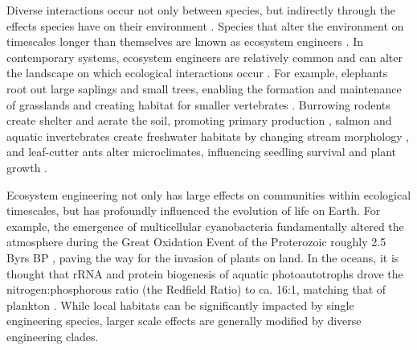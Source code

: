 \documentclass[9pt,twocolumn,twoside]{pnas-new}
\begin{document}
Diverse interactions occur not only between species, but indirectly through the effects species have on their environment \cite{Jones1994,Olff2009,OdlingSmee2013}.
Species that alter the environment on timescales longer than themselves are known as ecosystem engineers \cite{Hastings2007}.
In contemporary systems, ecosystem engineers are relatively common and can alter the landscape on which ecological interactions occur \cite{Wright2006}.
For example, elephants root out large saplings and small trees, enabling the formation and maintenance of grasslands \cite{Haynes2012} and creating habitat for smaller vertebrates \cite{Pringle2008}.
Burrowing rodents create shelter and aerate the soil, promoting primary production \cite{Reichman2002}, salmon and aquatic invertebrates create freshwater habitats by changing stream morphology \cite{Moore2006}, and leaf-cutter ants alter microclimates, influencing seedling survival and plant growth \cite{Meyer2011}.

Ecosystem engineering not only has large effects on communities within ecological timescales, but has profoundly influenced the evolution of life on Earth.
For example, the emergence of multicellular cyanobacteria fundamentally altered the atmosphere during the Great Oxidation Event of the Proterozoic roughly 2.5 Byrs BP \cite{Schirrmeister2013}, paving the way for the invasion of plants on land.
In the oceans, it is thought that rRNA and protein biogenesis of aquatic photoautotrophs drove the nitrogen:phosphorous ratio (the Redfield Ratio) to ca. 16:1, matching that of plankton \cite{Loladze2011}.
While local habitats can be significantly impacted by single engineering species, larger scale effects are generally modified by diverse engineering clades.

\end{document}

